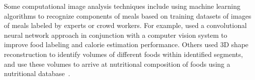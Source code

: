 Some computational image analysis techniques include using machine learning algorithms to recognize components of meals based on training datasets of images of meals labeled by experts or crowd workers. For example, \cite{pouladzadeh2016food} used a convolutional neural network approach in conjunction with a computer vision system to improve food labeling and calorie estimation performance. 
Others used 3D shape reconstruction to identify volumes of different foods within identified segments, and use these volumes to arrive at nutritional composition of foods using a nutritional database~\cite{anthimopoulos2015computer,rhyner2016carbohydrate}. 
